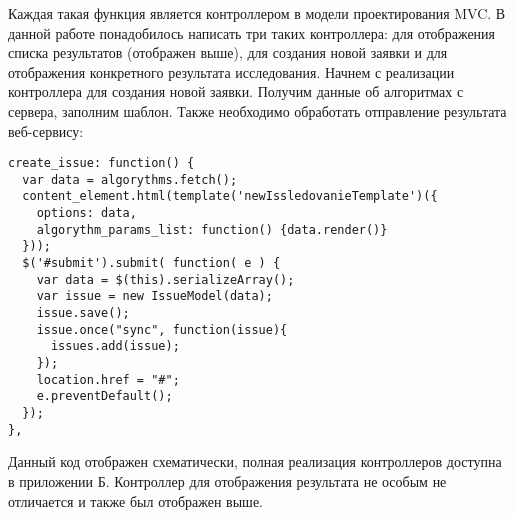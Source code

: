 Каждая такая функция является контроллером в модели проектирования MVC. В данной работе понадобилось написать три таких контроллера: для отображения списка результатов (отображен выше), для создания новой заявки и для отображения конкретного результата исследования. Начнем с реализации контроллера для создания новой заявки. Получим данные об алгоритмах с сервера, заполним шаблон. Также необходимо обработать отправление результата веб-сервису:
\begin{lstlisting}
create_issue: function() {
  var data = algorythms.fetch();
  content_element.html(template('newIssledovanieTemplate')({
    options: data,
    algorythm_params_list: function() {data.render()}
  }));
  $('#submit').submit( function( e ) {
    var data = $(this).serializeArray();
    var issue = new IssueModel(data);
    issue.save();
    issue.once("sync", function(issue){
      issues.add(issue);
    });
    location.href = "#";
    e.preventDefault();
  });
},
\end{lstlisting}
Данный код отображен схематически, полная реализация контроллеров доступна в приложении Б. Контроллер для отображения результата не особым не отличается и также был отображен выше.
